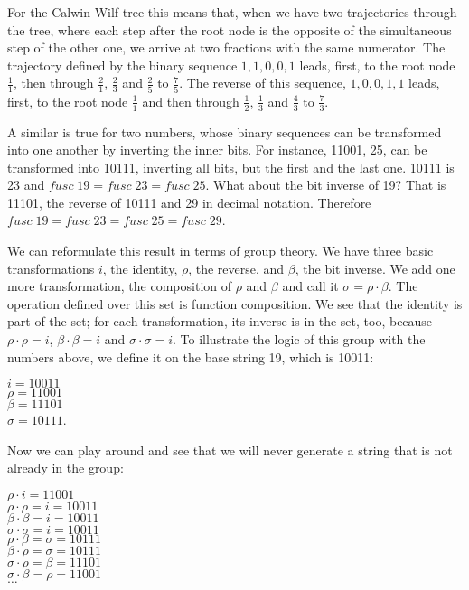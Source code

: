 \documentclass[tikz]{scrreprt}
\newcommand{\Varid}[1]{\mathit{#1}}
\begin{document}
For the Calwin-Wilf tree this means that,
when we have two trajectories through the tree,
where each step after the root node
is the opposite of the simultaneous step
of the other one, we arrive at two fractions
with the same numerator.
The trajectory defined by the binary sequence
$1,1,0,0,1$ leads, first, to the root node $\frac{1}{1}$,
then through 
$\frac{2}{1}$,
$\frac{2}{3}$ and
$\frac{2}{5}$ to
$\frac{7}{5}$.
The reverse of this sequence, $1,0,0,1,1$ leads,
first, to the root node $\frac{1}{1}$ and then through
$\frac{1}{2}$,
$\frac{1}{3}$ and
$\frac{4}{3}$ to
$\frac{7}{3}$.

A similar is true for two numbers,
whose binary sequences can be transformed
into one another by inverting the inner bits.
For instance, 11001, 25, can be transformed into
10111, inverting all bits, but the first and the last one.
10111 is 23 and \ensuremath{\Varid{fusc}\;\mathrm{19}\mathrel{=}\Varid{fusc}\;\mathrm{23}\mathrel{=}\Varid{fusc}\;\mathrm{25}}.
What about the bit inverse of 19?
That is 11101, the reverse of 10111 and 29 in decimal notation.
Therefore \ensuremath{\Varid{fusc}\;\mathrm{19}\mathrel{=}\Varid{fusc}\;\mathrm{23}\mathrel{=}\Varid{fusc}\;\mathrm{25}\mathrel{=}\Varid{fusc}\;\mathrm{29}}.

We can reformulate this result in terms of group theory.
We have three basic transformations $i$, the identity,
$\rho$, the reverse, and $\beta$, the bit inverse.
We add one more transformation, the composition of
$\rho$ and $\beta$ and call it $\sigma = \rho \cdot \beta$.
The operation defined over this set is function composition.
We see that the identity is part of the set;
for each transformation, its inverse is in the set, too,
because $\rho \cdot \rho = i$, $\beta \cdot \beta = i$ and
$\sigma \cdot \sigma = i$.
To illustrate the logic of this group with the numbers above,
we define it on the base string 19, which is 10011:

$i = 10011$\\
$\rho = 11001$\\
$\beta = 11101$\\
$\sigma = 10111$.

Now we can play around and see that we will
never generate a string that is not already 
in the group:

$\rho  \cdot i     = 11001$\\
$\rho  \cdot \rho  = i = 10011$\\
$\beta \cdot \beta = i = 10011$\\
$\sigma \cdot \sigma = i = 10011$\\
$\rho  \cdot \beta = \sigma = 10111$\\
$\beta \cdot \rho  = \sigma = 10111$\\
$\sigma \cdot \rho  = \beta = 11101$\\
$\sigma \cdot \beta = \rho  = 11001$\\
$\dots$
\end{document}
